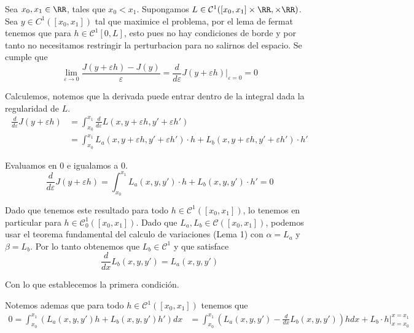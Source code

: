 \documentclass[a4paper,oneside,10.5pt]{USMArt}
\begin{document}
\begin{sol}
  Sea $x_{0}, x_{1} \in \RR$, tales que $x_{0} < x_{1}$. Supongamos
  $L \in \mathcal{C}^{1}([x_{0}, x_{1}] \times \RR, \times \RR)$. Sea $y \in C^{1}([x_{0}, x_{1}])$ tal que maximice
  el problema, por el lema de fermat tenemos que para $h \in \mathcal{C}^{1}[0, L]$, esto
  pues no hay condiciones de borde y por tanto no necesitamos restringir la perturbacion para
  no salirnos del espacio. Se cumple que
  \begin{equation*}
    \lim_{\varepsilon \to 0} \frac{J(y + \varepsilon h) - J(y)}{\varepsilon} = \frac{d}{d\varepsilon} J(y + \varepsilon h)|_{\varepsilon = 0} = 0
  \end{equation*}

  Calculemos, notemos que la derivada puede entrar dentro de la integral dada la regularidad de $L$.
  \begin{align*}
    \frac{d}{d\varepsilon} J(y + \varepsilon h) &= \int_{x_{0}}^{x_{1}} \frac{d}{d\varepsilon} L(x, y + \varepsilon h, y' + \varepsilon h')\\
    &= \int_{x_{0}}^{x_{1}} L_{a}(x, y + \varepsilon h, y' + \varepsilon h') \cdot h + L_{b}(x, y + \varepsilon h, y' + \varepsilon h') \cdot h'
  \end{align*}

  Evaluamos en $0$ e igualamos a $0$.
  \begin{equation*}
    \frac{d}{d\varepsilon} J(y + \varepsilon h) = \int_{x_{0}}^{x_{1}} L_{a}(x, y, y') \cdot h + L_{b}(x, y, y') \cdot h' = 0
  \end{equation*}

  Dado que tenemos este resultado para todo $h \in \mathcal{C}^{1}([x_{0}, x_{1}])$, lo tenemos en particular para
  $h \in \mathcal{C}_{0}^{1}([x_{0}, x_{1}])$. Dado que $L_{a}, L_{b} \in \mathcal{C}([x_{0}, x_{1}])$, podemos usar
  el teorema fundamental del calculo de variaciones (Lema 1) con $\alpha = L_{a}$ y $\beta = L_{b}$. Por lo tanto
  obtenemos que $L_{b} \in \mathcal{C}^{1}$ y que satisface
  \begin{equation*}
    \frac{d}{dx} L_{b}(x, y, y') = L_{a}(x, y, y')
  \end{equation*}

  Con lo que establecemos la primera condición.

  Notemos ademas que para todo $h \in \mathcal{C}^{1}([x_{0}, x_{1}])$ tenemos que
  \begin{align*}
   0 = \int_{x_{0}}^{x_{1}} (L_{a}(x, y, y')h + L_{b}(x, y , y')h') dx &= \int_{x_{0}}^{x_{1}} (L_{a}(x, y, y') - \frac{d}{dx} L_{b}(x, y, y'))h  dx + L_{b} \cdot h|_{x = x_{0}}^{x = x_{1}}
  \end{align*}


\end{sol}
\end{document}
